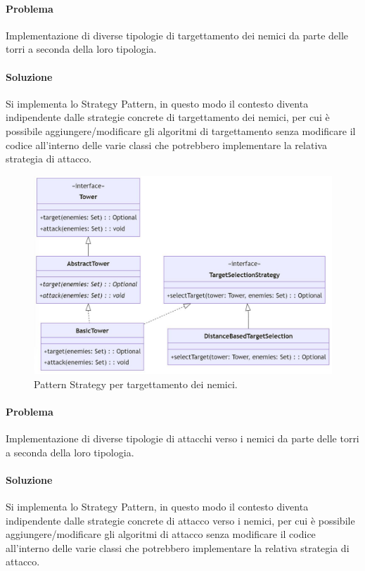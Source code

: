\documentclass[a4paper,12pt]{report}
\begin{document}
\paragraph{Problema}
Implementazione di diverse tipologie di targettamento dei nemici da parte delle torri a seconda della loro tipologia.
\paragraph{Soluzione}
Si implementa lo Strategy Pattern, in questo modo il contesto diventa indipendente dalle strategie concrete di targettamento dei nemici, per cui è possibile aggiungere/modificare gli algoritmi di targettamento senza modificare il codice all'interno delle varie classi che potrebbero implementare la relativa strategia di attacco.

\begin{figure}[H]
    \centering
    \includegraphics[width=0.8\linewidth]{defense_target}
    \caption{Pattern Strategy per targettamento dei nemici.}
    \label{fig:defense_target}
\end{figure}

\vspace{70mm}

\paragraph{Problema}
Implementazione di diverse tipologie di attacchi verso i nemici da parte delle torri a seconda della loro tipologia.
\paragraph{Soluzione}
Si implementa lo Strategy Pattern, in questo modo il contesto diventa indipendente dalle strategie concrete di attacco verso i nemici, per cui è possibile aggiungere/modificare gli algoritmi di attacco senza modificare il codice all'interno delle varie classi che potrebbero implementare la relativa strategia di attacco.
\end{document}

